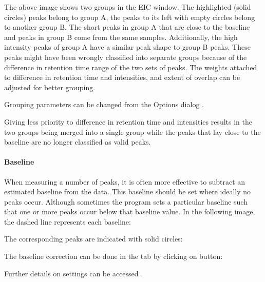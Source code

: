 \documentclass[letterpaper,10pt,english,openany,oneside]{sphinxmanual}
\begin{document}


The above image shows two groups in the EIC window. The highlighted (solid circles) peaks belong to group A, the peaks to its left with empty circles belong to another group B. The short peaks in group A that are close to the baseline and peaks in group B come from the same samples. Additionally, the high intensity peaks of group A have a similar peak shape to group B peaks. These peaks might have been wrongly classified into separate groups because of the difference in retention time range of the two sets of peaks. The weights attached to difference in retention time and intensities, and extent of overlap can be adjusted for better grouping.

Grouping parameters can be changed from the Options dialog .



Giving less priority to difference in retention time and intensities results in the two groups being merged into a single  group while the peaks that lay close to the baseline are no longer classified as valid peaks.


\paragraph{Baseline}
\label{\detokenize{LabeledLCMSWorkflow:baseline}}
When measuring a number of peaks, it is often more effective to subtract an estimated baseline from the data. This baseline should be set where ideally no peaks occur. Although sometimes the program sets a particular baseline such that one or more peaks occur below that baseline value. In the following image, the dashed line represents each baseline:


The corresponding peaks are indicated with solid circles:


The baseline correction can be done in the  tab by clicking on  button:


Further details on settings can be accessed .
\end{document}
